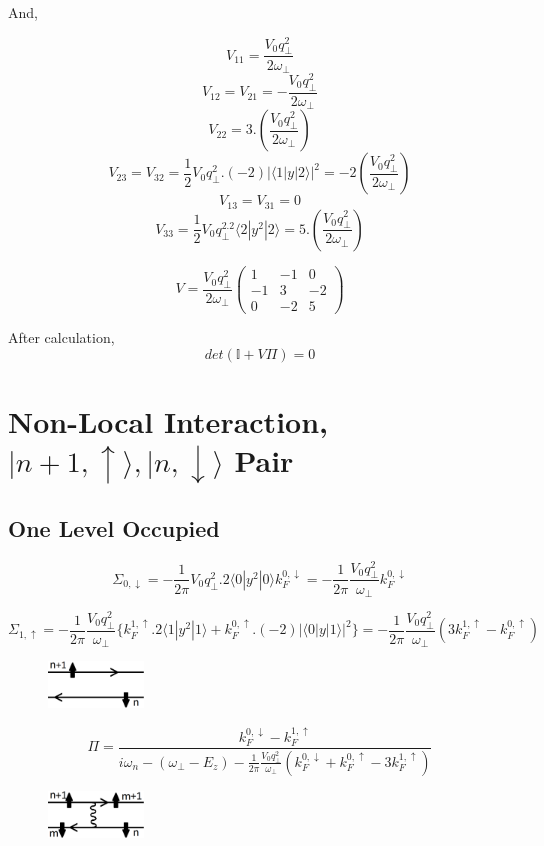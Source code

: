 And,

\[V_{11}=\frac{V_0 q_\perp^2}{2\omega_{\perp}}\]
\[V_{12}=V_{21}=-\frac{V_0 q_\perp^2}{2\omega_{\perp}}\]
\[V_{22}=3.\left(\frac{V_0 q_\perp^2}{2\omega_{\perp}}\right)\]
\[V_{23}=V_{32}=\frac{1}{2} V_0 q_\perp^2.(-2) |\langle 1|y|2\rangle|^2=-2\left(\frac{V_0 q_\perp^2}{2\omega_{\perp}}\right)\]
\[V_{13}=V_{31}=0\]
\[V_{33}=\frac{1}{2} V_0 q_\perp^2.2\langle 2|y^2|2\rangle = 5.\left(\frac{V_0 q_\perp^2}{2\omega_{\perp}}\right)\]

\[V=\frac{V_0 q_\perp^2}{2\omega_{\perp}} \left(\begin{matrix}
		1 & -1 & 0\\
		-1 & 3 & -2\\
		0 & -2 & 5 \end{matrix}\right)\]
		
After calculation, \[det(\mathbb{I}+V\Pi)=0\]

\section{Non-Local Interaction, $|n+1,\uparrow\rangle ,|n,\downarrow\rangle$ Pair}

\subsection{One Level Occupied}

\[\Sigma_{0,\downarrow}=-\frac{1}{2\pi} V_0 q_\perp^2. 2\langle 0|y^2|0 \rangle k_F^{0,\downarrow} = -\frac{1}{2\pi} \frac{V_0 q_\perp^2}{\omega_{\perp}}k_F^{0,\downarrow}\]

\[\Sigma_{1,\uparrow}=-\frac{1}{2\pi} \frac{V_0 q_\perp^2}{\omega_{\perp}} \{k_F^{1,\uparrow}.2\langle 1|y^2|1\rangle + k_F^{0,\uparrow}.(-2)|\langle 0|y|1\rangle|^2\} = -\frac{1}{2\pi} \frac{V_0 q_\perp^2}{\omega_{\perp}} (3k_F^{1,\uparrow}-k_F^{0,\uparrow})\]

\begin{figure}[h]
	\centering
	\includegraphics[width=1in]{apfig3}
\end{figure}

\[\Pi=\frac{k_F^{0,\downarrow}-k_F^{1,\uparrow}}{i\omega_n-(\omega_{\perp}-E_z)-\frac{1}{2\pi} \frac{V_0 q_\perp^2}{\omega_{\perp}} (k_F^{0,\downarrow}+k_F^{0,\uparrow}-3k_F^{1,\uparrow})}\]

\begin{figure}[h]
	\centering
	\includegraphics[width=1in]{apfig4}
\end{figure}

